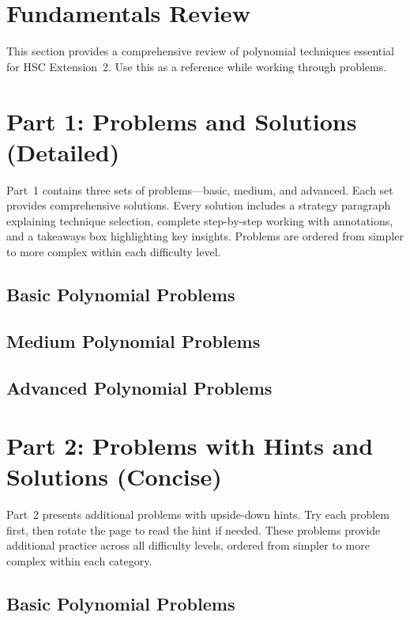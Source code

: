 \documentclass[12pt]{article}
\begin{document}
\newpage
\section{Fundamentals Review}
This section provides a comprehensive review of polynomial techniques essential for HSC Extension~2. Use this as a reference while working through problems.



\newpage
\section{Part 1: Problems and Solutions (Detailed)}
Part~1 contains three sets of problems---basic, medium, and advanced. Each set provides comprehensive solutions. Every solution includes a strategy paragraph explaining technique selection, complete step-by-step working with annotations, and a takeaways box highlighting key insights. Problems are ordered from simpler to more complex within each difficulty level.

\subsection{Basic Polynomial Problems}


\subsection{Medium Polynomial Problems}


\subsection{Advanced Polynomial Problems}


\newpage
\section{Part 2: Problems with Hints and Solutions (Concise)}
Part~2 presents additional problems with upside-down hints. Try each problem first, then rotate the page to read the hint if needed. These problems provide additional practice across all difficulty levels, ordered from simpler to more complex within each category.

\subsection{Basic Polynomial Problems}

\end{document}
